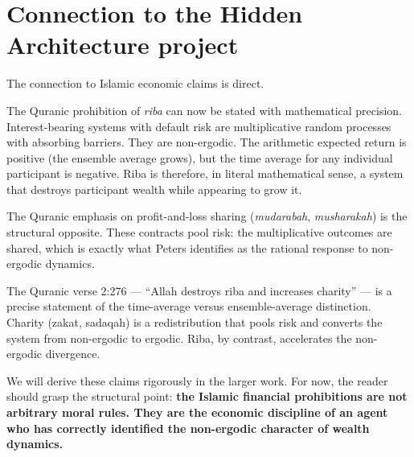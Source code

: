 \documentclass[11pt,a4paper]{book}
\theoremstyle{cleanrm}
\begin{document}
\section{Connection to the Hidden Architecture project}

The connection to Islamic economic claims is direct.

The Quranic prohibition of \emph{riba} can now be stated with
mathematical precision. Interest-bearing systems with default risk are
multiplicative random processes with absorbing barriers. They are
non-ergodic. The arithmetic expected return is positive (the
ensemble average grows), but the time average for any individual
participant is negative. Riba is therefore, in literal mathematical
sense, a system that destroys participant wealth while appearing to
grow it.

The Quranic emphasis on profit-and-loss sharing (\emph{mudarabah},
\emph{musharakah}) is the structural opposite. These contracts pool
risk: the multiplicative outcomes are shared, which is exactly what
Peters identifies as the rational response to non-ergodic dynamics.

The Quranic verse 2:276 --- ``Allah destroys riba and increases
charity'' --- is a precise statement of the time-average versus
ensemble-average distinction. Charity (zakat, sadaqah) is a
redistribution that pools risk and converts the system from
non-ergodic to ergodic. Riba, by contrast, accelerates the
non-ergodic divergence.

We will derive these claims rigorously in the larger work. For now,
the reader should grasp the structural point: \textbf{the Islamic
financial prohibitions are not arbitrary moral rules. They are the
economic discipline of an agent who has correctly identified the
non-ergodic character of wealth dynamics.}
\end{document}
